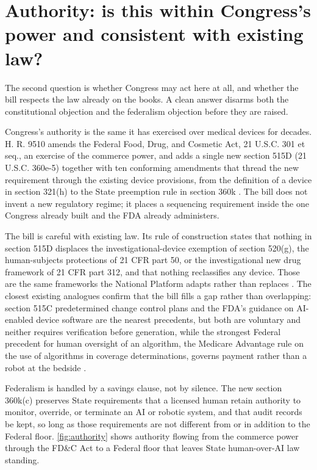 \section{Authority: is this within Congress's power and consistent with existing law?}
\label{sec:authority}

The second question is whether Congress may act here at all, and whether the bill
respects the law already on the books. A clean answer disarms both the
constitutional objection and the federalism objection before they are raised.

Congress's authority is the same it has exercised over medical devices for decades.
H. R. 9510 amends the Federal Food, Drug, and Cosmetic Act, 21 U.S.C. 301 et seq.,
an exercise of the commerce power, and adds a single new section 515D (21 U.S.C.
360e-5) together with ten conforming amendments that thread the new requirement
through the existing device provisions, from the definition of a device in section
321(h) to the State preemption rule in section 360k \cite{fdcact,
Kawchak2026HR9510Bill}. The bill does not invent a new regulatory regime; it places a
sequencing requirement inside the one Congress already built and the FDA already
administers.

The bill is careful with existing law. Its rule of construction states that nothing
in section 515D displaces the investigational-device exemption of section 520(g),
the human-subjects protections of 21 CFR part 50, or the investigational new drug
framework of 21 CFR part 312, and that nothing reclassifies any device. Those are the
same frameworks the National Platform adapts rather than replaces
\cite{Kawchak2026Adaption21CFRPart, Kawchak2026Adaption21CFRPartb,
Kawchak2026AdaptionICHHarmonisedGuideline}. The closest existing analogues confirm
that the bill fills a gap rather than overlapping: section 515C predetermined change
control plans and the FDA's guidance on AI-enabled device software are the nearest
precedents, but both are voluntary and neither requires verification before
generation, while the strongest Federal precedent for human oversight of an
algorithm, the Medicare Advantage rule on the use of algorithms in coverage
determinations, governs payment rather than a robot at the bedside
\cite{cms2024aiguardrails}.

Federalism is handled by a savings clause, not by silence. The new section 360k(c)
preserves State requirements that a licensed human retain authority to monitor,
override, or terminate an AI or robotic system, and that audit records be kept, so
long as those requirements are not different from or in addition to the Federal
floor. \autoref{fig:authority} shows authority flowing from the commerce power
through the FD\&C Act to a Federal floor that leaves State human-over-AI law standing.


